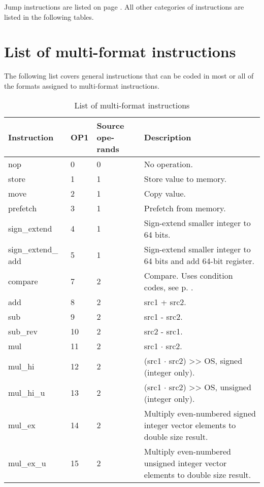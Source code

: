 \documentclass[forwardcom.tex]{subfiles}
\begin{document}
Jump instructions are listed on page \pageref{table:controlTransferInstructions}. All other categories of instructions are listed in the following tables.


\section{List of multi-format instructions}
The following list covers general instructions that can be coded in most or all of the formats
assigned to multi-format instructions.

\begin{longtable} {|p{18mm}|p{9mm}|p{9mm}|p{76mm}|}
\caption{
List of multi-format instructions} 
\label{table:ListOfMultiFormatInstructions} \\
\endfirsthead
\endhead
\hline
\bfseries Instruction & \bfseries OP1 & \bfseries Source ope-rands & \bfseries Description \\
\hline
nop          &  0 & 0 & No operation. \\
store        &  1 & 1 & Store value to memory. \\
move         &  2 & 1 & Copy value. \\
prefetch     &  3 & 1 & Prefetch from memory. \\
sign\_extend &  4 & 1 & Sign-extend smaller integer to 64 bits. \\
sign\_extend\_ add & 5 & 1 & Sign-extend smaller integer to 64 bits and add 64-bit register. \\
compare      &  7 & 2 & Compare. Uses condition codes, see p. \pageref{table:conditionCodesForCompareInstruction}. \\
add          &  8 & 2 & src1 + src2. \\
sub          &  9 & 2 & src1 - src2. \\
sub\_rev     & 10 & 2 & src2 - src1. \\
mul          & 11 & 2 & src1 $\cdot$ src2. \\ 
mul\_hi      & 12 & 2 & (src1 $\cdot$ src2) \textgreater\textgreater{} OS, signed (integer only). \\
mul\_hi\_u   & 13 & 2 & (src1 $\cdot$ src2) \textgreater\textgreater{}  OS, unsigned (integer only). \\
mul\_ex      & 14 & 2 & Multiply even-numbered signed integer vector elements to double size result. \\
mul\_ex\_u   & 15 & 2 & Multiply even-numbered unsigned integer vector elements to double size result. \\

\end{longtable}
\end{document}
